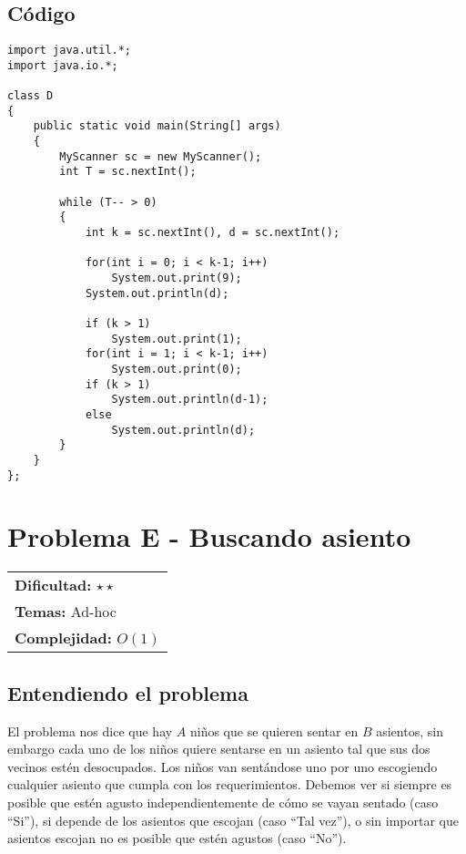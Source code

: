 \subsection*{Código}

\begin{verbatim}
import java.util.*;
import java.io.*;
 
class D
{
    public static void main(String[] args)
    {
        MyScanner sc = new MyScanner();
        int T = sc.nextInt();
 
        while (T-- > 0)
        {
            int k = sc.nextInt(), d = sc.nextInt();
 
            for(int i = 0; i < k-1; i++)
                System.out.print(9);
            System.out.println(d);
 
            if (k > 1)
                System.out.print(1);
            for(int i = 1; i < k-1; i++)
                System.out.print(0);
            if (k > 1)
                System.out.println(d-1);
            else
                System.out.println(d);
        }
    }
};
\end{verbatim}

\section{Problema E - Buscando asiento}

\hfill
\begin{tabular}{@{}l@{}}
\textbf{Dificultad:} $\star \star$ \\
\textbf{Temas:} Ad-hoc \\
\textbf{Complejidad:} $O(1)$
\end{tabular}

\subsection*{Entendiendo el problema}
El problema nos dice que hay $A$ niños que se quieren sentar en $B$ asientos, sin embargo cada uno de los niños quiere sentarse en un asiento tal que sus dos vecinos estén desocupados. Los niños van sentándose uno por uno escogiendo cualquier asiento que cumpla con los requerimientos. Debemos ver si siempre es posible que estén agusto independientemente de cómo se vayan sentado (caso ``Si''), si depende de los asientos que escojan (caso ``Tal vez''), o sin importar que asientos escojan no es posible que estén agustos (caso ``No''). 

